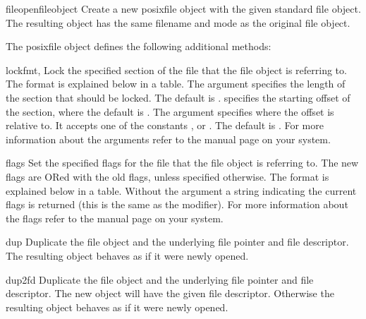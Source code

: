 \begin{funcdesc}{fileopen}{fileobject}
 Create a new posixfile object with the given standard file object.
 The resulting object has the same filename and mode as the original
 file object.
\end{funcdesc}

The posixfile object defines the following additional methods:

\begin{methoddesc}[posixfile]{lock}{fmt, }
 Lock the specified section of the file that the file object is
 referring to.  The format is explained
 below in a table.  The  argument specifies the length of the
 section that should be locked. The default is . 
 specifies the starting offset of the section, where the default is
 .  The  argument specifies where the offset is
 relative to. It accepts one of the constants ,
  or .  The default is
 .  For more information about the arguments refer
 to the  manual page on your system.
\end{methoddesc}

\begin{methoddesc}[posixfile]{flags}{}
 Set the specified flags for the file that the file object is referring
 to.  The new flags are ORed with the old flags, unless specified
 otherwise.  The format is explained below in a table.  Without
 the  argument
 a string indicating the current flags is returned (this is
 the same as the  modifier).  For more information about the
 flags refer to the  manual page on your system.
\end{methoddesc}

\begin{methoddesc}[posixfile]{dup}{}
 Duplicate the file object and the underlying file pointer and file
 descriptor.  The resulting object behaves as if it were newly
 opened.
\end{methoddesc}

\begin{methoddesc}[posixfile]{dup2}{fd}
 Duplicate the file object and the underlying file pointer and file
 descriptor.  The new object will have the given file descriptor.
 Otherwise the resulting object behaves as if it were newly opened.
\end{methoddesc}

